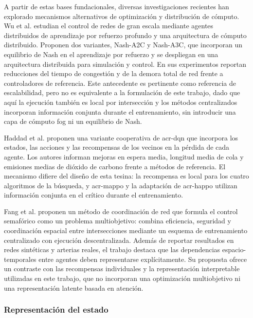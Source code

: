 A partir de estas bases fundacionales, diversas investigaciones recientes han explorado mecanismos alternativos de optimización y distribución de cómputo. Wu et al. \cite{wu2022distributed} estudian el control de redes de gran escala mediante agentes distribuidos de aprendizaje por refuerzo profundo y una arquitectura de cómputo distribuido. Proponen dos variantes, Nash-A2C y Nash-A3C, que incorporan un equilibrio de Nash en el aprendizaje por refuerzo y se despliegan en una arquitectura distribuida para simulación y control. En sus experimentos reportan reducciones del tiempo de congestión y de la demora total de red frente a controladores de referencia. Este antecedente es pertinente como referencia de escalabilidad, pero no es equivalente a la formulación de este trabajo, dado que aquí la ejecución también es local por intersección y los métodos centralizados incorporan información conjunta durante el entrenamiento, sin introducir una capa de cómputo fog ni un equilibrio de Nash.

Haddad et al. \cite{haddad2022cooperative} proponen una variante cooperativa de \acrshort{acr-dqn} que incorpora los estados, las acciones y las recompensas de los vecinos en la pérdida de cada agente. Los autores informan mejoras en espera media, longitud media de cola y emisiones medias de dióxido de carbono frente a métodos de referencia. El mecanismo difiere del diseño de esta tesina: la recompensa es local para los cuatro algoritmos de la búsqueda, y \acrshort{acr-mappo} y la adaptación de \acrshort{acr-happo} utilizan información conjunta en el crítico durante el entrenamiento.

Fang et al. \cite{fang2023nacrl} proponen un método de coordinación de red que formula el control semafórico como un problema multiobjetivo: combina eficiencia, seguridad y coordinación espacial entre intersecciones mediante un esquema de entrenamiento centralizado con ejecución descentralizada. Además de reportar resultados en redes sintéticas y arterias reales, el trabajo destaca que las dependencias espacio-temporales entre agentes deben representarse explícitamente. Su propuesta ofrece un contraste con las recompensas individuales y la representación interpretable utilizadas en este trabajo, que no incorporan una optimización multiobjetivo ni una representación latente basada en atención.

\subsubsection{Representación del estado}

